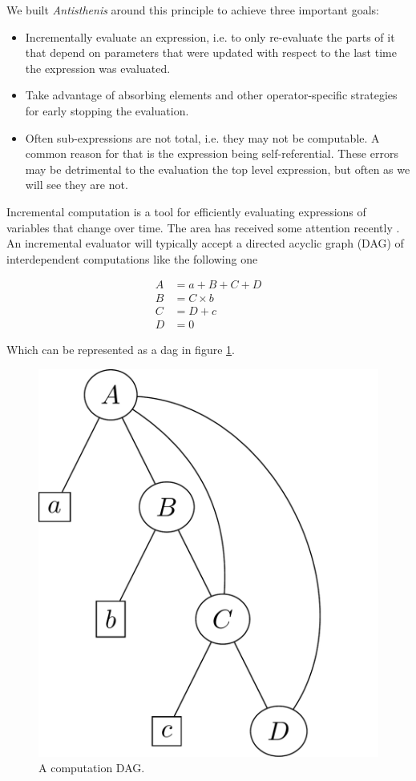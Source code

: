 We built \emph{Antisthenis} around this principle to achieve three
important goals:

\begin{itemize}
\item Incrementally evaluate an expression, i.e. to only re-evaluate
  the parts of it that depend on parameters that were updated with
  respect to the last time the expression was evaluated.
\item Take advantage of absorbing elements and other operator-specific
  strategies for early stopping the evaluation.
\item Often sub-expressions are not total, i.e. they may not be
  computable. A common reason for that is the expression being
  self-referential. These errors may be detrimental to the evaluation
  the top level expression, but often as we will see they are not.
\end{itemize}

Incremental computation is a tool for efficiently evaluating
expressions of variables that change over time. The area has received
some attention recently
\cite{bhatotiaIncoopMapReduceIncremental2011,hammerAdaptonComposableDemanddriven2014a}. An
incremental evaluator will typically accept a directed acyclic graph
(DAG) of interdependent computations like the following one

\begin{align*}
A &= a + B + C + D  \\
B &= C \times b \\
C & = D + c \\
D &= 0
\end{align*}

Which can be represented as a dag in figure
\ref{fig:example_antisthenis_dag}.

\begin{figure}[H]
\centering
\includegraphics[width=.9\linewidth]{./imgs/example_antisthenis_dag.pdf}
\caption{\label{fig:example_antisthenis_dag}A computation DAG.}
\end{figure}

